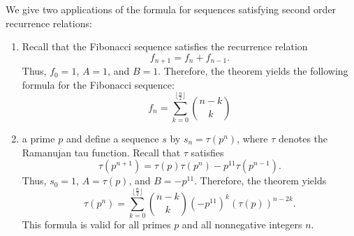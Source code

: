 \documentclass[12pt]{article}
\begin{document}

We give two applications of the formula for sequences satisfying second order recurrence relations:

\begin{enumerate}
\item Recall that the Fibonacci sequence satisfies the recurrence relation
\[
f_{n+1}=f_n + f_{n-1}.
\]
Thus, $f_0=1$, $A=1$, and $B=1$.  Therefore, the theorem yields the following formula for the Fibonacci sequence:
\[
f_n=\sum_{k=0}^{\lfloor\frac{n}{2}\rfloor} \binom{n-k}{k}
\]
\item {} a prime $p$ and define a sequence $s$ by $s_n=\tau(p^n)$, where $\tau$ denotes the Ramanujan tau function.  Recall that $\tau$ satisfies
\[
\tau(p^{n+1})=\tau(p)\tau(p^n)-p^{11}\tau(p^{n-1}).
\]
Thus, $s_0=1$, $A=\tau(p)$, and $B=-p^{11}$.  Therefore, the theorem yields
\[
\tau(p^n)=\sum_{k=0}^{\lfloor\frac{n}{2}\rfloor} \binom{n-k}{k} (-p^{11})^k (\tau(p))^{n-2k}.
\]
This formula is valid for all primes $p$ and all nonnegative integers $n$.
\end{enumerate}
\end{document}
